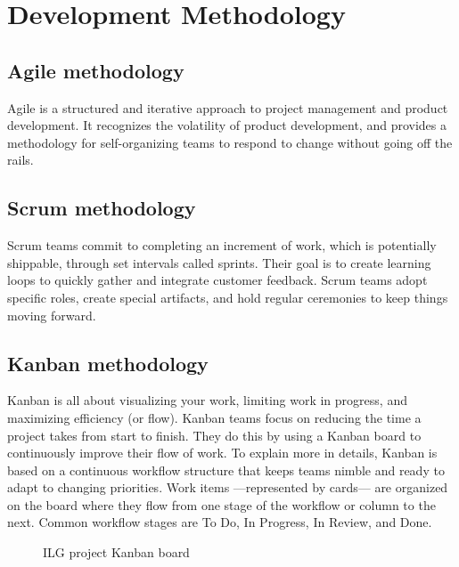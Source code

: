 \section{Development Methodology}
\subsection{Agile methodology}
Agile is a structured and iterative approach to project management and product development. It recognizes the volatility of product development, and provides a methodology for self-organizing teams to respond to change without going off the rails.

\subsection{Scrum methodology}
Scrum teams commit to completing an increment of work, which is potentially shippable, through set intervals called sprints. Their goal is to create learning loops to quickly gather and integrate customer feedback. Scrum teams adopt specific roles, create special artifacts, and hold regular ceremonies to keep things moving forward.

\subsection{Kanban methodology}
Kanban is all about visualizing your work, limiting work in progress, and maximizing efficiency (or flow). Kanban teams focus on reducing the time a project takes from start to finish. They do this by using a Kanban board to continuously improve their flow of work. To explain more in details, Kanban is based on a continuous workflow structure that keeps teams nimble and ready to adapt to changing priorities. Work items —represented by cards— are organized on the board where they flow from one stage of the workflow or column to the next. Common workflow stages are To Do, In Progress, In Review, and Done.

\begin{figure}[H]
    \centering
    \caption{ILG project Kanban board}
    \label{fig:ilg-project-kanban-board}
\end{figure}

